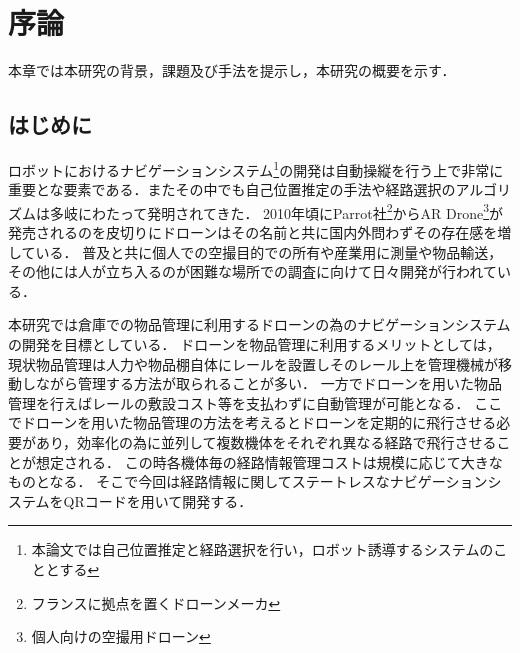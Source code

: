\chapter{序論}
\label{introduction}

本章では本研究の背景，課題及び手法を提示し，本研究の概要を示す．

\section{はじめに}
ロボットにおけるナビゲーションシステム\footnote{本論文では自己位置推定と経路選択を行い，ロボット誘導するシステムのこととする}の開発は自動操縦を行う上で非常に重要とな要素である．またその中でも自己位置推定の手法や経路選択のアルゴリズムは多岐にわたって発明されてきた．
2010年頃にParrot社\footnote{フランスに拠点を置くドローンメーカ}からAR Drone\footnote{個人向けの空撮用ドローン}が発売されるのを皮切りにドローンはその名前と共に国内外問わずその存在感を増している．
普及と共に個人での空撮目的での所有や産業用に測量や物品輸送，その他には人が立ち入るのが困難な場所での調査に向けて日々開発が行われている．


本研究では倉庫での物品管理に利用するドローンの為のナビゲーションシステムの開発を目標としている．
ドローンを物品管理に利用するメリットとしては，現状物品管理は人力や物品棚自体にレールを設置しそのレール上を管理機械が移動しながら管理する方法が取られることが多い．
一方でドローンを用いた物品管理を行えばレールの敷設コスト等を支払わずに自動管理が可能となる．
ここでドローンを用いた物品管理の方法を考えるとドローンを定期的に飛行させる必要があり，効率化の為に並列して複数機体をそれぞれ異なる経路で飛行させることが想定される．
この時各機体毎の経路情報管理コストは規模に応じて大きなものとなる．
そこで今回は経路情報に関してステートレスなナビゲーションシステムをQRコードを用いて開発する．




